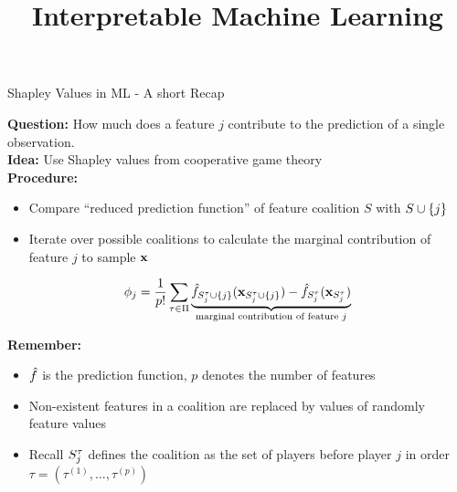\documentclass[11pt,compress,t,notes=noshow, aspectratio=169, xcolor=table]{beamer}
\title{Interpretable Machine Learning}
\date{}
\begin{document}
\newcommand{\titlefigure}{figure_man/exSHAP.png}
\newcommand{\learninggoals}{
\item Get an intuition of additive feature attributions
\item Understand the concept of Kernel SHAP
\item Ability to interpret SHAP plots
\item Global SHAP methods
}


\begin{frame}{Shapley Values in ML - A short Recap}
  
  \textbf{Question:} How much does a feature $j$ contribute to the prediction of a single observation. \\
  \textbf{Idea:} Use Shapley values from cooperative game theory \\
  \pause
  \textbf{Procedure:} 
  \begin{itemize}
    \item Compare ``reduced prediction function'' of feature coalition $S$ with $\Scupj$ 
    \item Iterate over possible coalitions to calculate the marginal contribution of feature $j$ to sample $\xv$
\end{itemize}

$$\phi_j 
= \frac{1}{p!} \sum_{\tau \in \Pi}  \underbrace{\fh_{\Stauj}(\xv_{\Stauj}) - \fh_{\Stau}(\xv_{\Stau})}_{\text{marginal contribution of feature $j$}} $$

\pause
\textbf{Remember:}

\begin{itemize}
    \item $\fh$ is the prediction function, $p$ denotes the number of features
    \item Non-existent features in a coalition are replaced by values of randomly feature values 
    \item Recall $\Stau$ defines the coalition as the set of players before player $j$ in order $\tau = (\tau^{(1)}, \dots, \tau^{(p)})$%
    

\end{itemize}
\end{frame}
\end{document}
